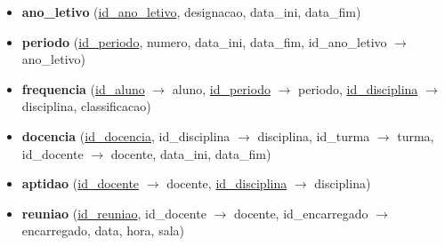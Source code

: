 \documentclass[12pt,a4paper,reqno]{report}
\numberwithin{figure}{section}
\numberwithin{equation}{section}
\begin{document}
\begin{itemize}
\item \textbf{ano\_letivo} (\underline{id\_ano\_letivo}, designacao, data\_ini, data\_fim)

\item \textbf{periodo} (\underline{id\_periodo}, numero, data\_ini, data\_fim, id\_ano\_letivo $\rightarrow$ ano\_letivo)

\item \textbf{frequencia} (\underline{id\_aluno} $\rightarrow$ aluno, \underline{id\_periodo} $\rightarrow$ periodo, \underline{id\_disciplina} $\rightarrow$ disciplina, classificacao)

\item \textbf{docencia} (\underline{id\_docencia}, id\_disciplina $\rightarrow$ disciplina, id\_turma $\rightarrow$ turma, id\_docente $\rightarrow$ docente, data\_ini, data\_fim)

\item \textbf{aptidao} (\underline{id\_docente} $\rightarrow$ docente, \underline{id\_disciplina} $\rightarrow$ disciplina)

\item \textbf{reuniao} (\underline{id\_reuniao}, id\_docente $\rightarrow$ docente, id\_encarregado $\rightarrow$ encarregado, data, hora, sala)

\end{itemize}
\end{document}
